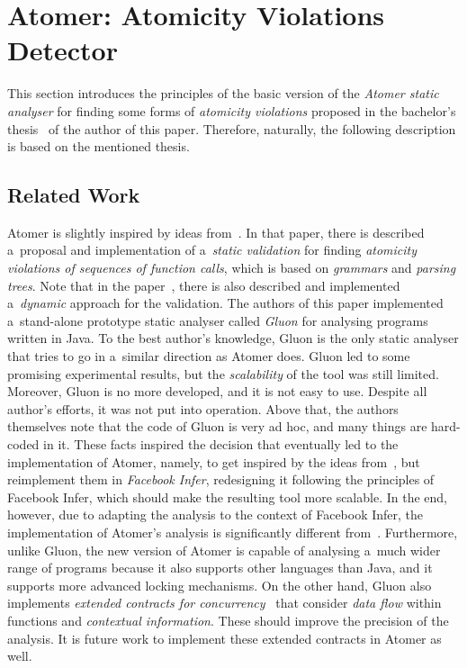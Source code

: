 \documentclass{ExcelAtFIT}
\theoremstyle{example}
\begin{document}
\section{\hspace{-.15em}Atomer: Atomicity Violations Detector}
\label{sec:atomer}

This section introduces the principles of the basic version of the \emph{Atomer static analyser} for finding some forms of \emph{atomicity violations} proposed in the bachelor's thesis~\cite{harmimBP} of the author of this paper. Therefore, naturally, the following description is based on the mentioned thesis.

\subsection{Related Work}

Atomer is slightly inspired by ideas from~\cite{contracts2017}. In that paper, there is described a~proposal and implementation of a~\emph{static validation} for finding \emph{atomicity violations of sequences of function calls}, which is based on \emph{grammars} and \emph{parsing trees}. Note that in the paper~\cite{contracts2017}, there is also described and implemented a~\emph{dynamic} approach for the validation. The authors of this paper implemented a~stand-alone prototype static analyser called \emph{Gluon} for analysing programs written in Java. To the best author's knowledge, Gluon is the only static analyser that tries to go in a~similar direction as Atomer does. Gluon led to some promising experimental results, but the \emph{scalability} of the tool was still limited. Moreover, Gluon is no more developed, and it is not easy to use. Despite all author's efforts, it was not put into operation. Above that, the authors themselves note that the code of Gluon is very ad hoc, and many things are hard-coded in it. These facts inspired the decision that eventually led to the implementation of Atomer, namely, to get inspired by the ideas from~\cite{contracts2017}, but reimplement them in \emph{Facebook Infer}, redesigning it following the principles of Facebook Infer, which should make the resulting tool more scalable. In the end, however, due to adapting the analysis to the context of Facebook Infer, the implementation of Atomer's analysis is significantly different from~\cite{contracts2017}. Furthermore, unlike Gluon, the new version of Atomer is capable of analysing a~much wider range of programs because it also supports other languages than Java, and it supports more advanced locking mechanisms. On the other hand, Gluon also implements \emph{extended contracts for concurrency}~\cite{contracts2017} that consider \emph{data flow} within functions and \emph{contextual information}. These should improve the precision of the analysis. It is future work to implement these extended contracts in Atomer as well.
\end{document}
